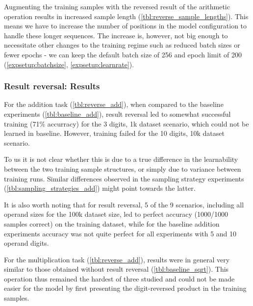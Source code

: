 Augmenting the training samples with the reversed result of the arithmetic operation results in increased sample length (\cref{tbl:reverse_sample_lengths}).
This means we have to increase the number of positions in the model configuration to handle these longer sequences. The increase is, however, not big enough to necessitate other changes to the training regime such as reduced batch sizes or fewer epochs - we can keep the default batch size of 256 and epoch limit of 200 (\cref{expsetup:batchsize}, \cref{expsetup:learnrate}).

\subsubsection{Result reversal: Results}


For the addition task (\cref{tbl:reverse_add}), when compared to the baseline experiments (\cref{tbl:baseline_add}), result reversal led to somewhat successful training (71\% accurracy) for the 3 digits, 1k dataset scenario, which could not be learned in baseline. However, training failed for the 10 digits, 10k dataset scenario.

To us it is not clear whether this is due to a true difference in the learnability between the two training sample structures, or simply due to variance between training runs. Similar differences observed in the sampling strategy experiments (\cref{tbl:sampling_strategies_add}) might point towards the latter.

It is also worth noting that for result reversal, 5 of the 9 scenarios, including all operand sizes for the 100k dataset size, led to perfect accuracy (1000/1000 samples correct) on the training dataset, while for the baseline addition experiments accuracy was not quite perfect for all experiments with 5 and 10 operand digits.


For the multiplication task (\cref{tbl:reverse_add}), results were in general very similar to those obtained without result reversal (\cref{tbl:baseline_sqrt}). This operation thus remained the hardest of three studied and could not be made easier for the model by first presenting the digit-reversed product in the training samples.

